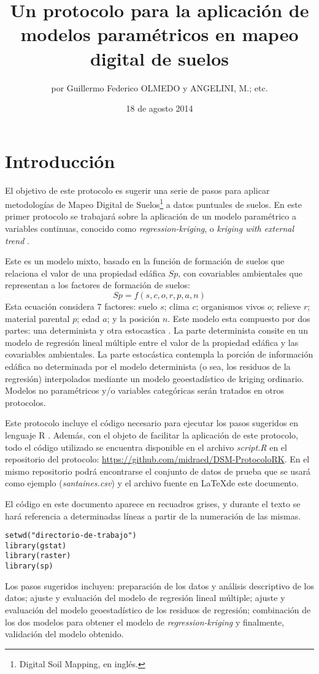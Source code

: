 \documentclass[10pt,a4paper]{article}
\date{18 de agosto 2014}
\title{Un protocolo para la aplicación de modelos paramétricos en mapeo digital de suelos}
\author{por Guillermo Federico OLMEDO y ANGELINI, M.; etc.}
\begin{document}
\maketitle
\section{Introducción}
El objetivo de este protocolo es sugerir una serie de pasos para aplicar metodologías de Mapeo Digital de Suelos\footnote{Digital Soil Mapping, en inglés.} a datos puntuales de suelos. En este primer protocolo se trabajará sobre la aplicación de un modelo paramétrico a variables continuas, conocido como \textit{regression-kriging}, o \textit{kriging with external trend} \citep{hengl_practical_2009}. 

Este es un modelo mixto, basado en la función de formación de suelos \citep{mcbratney_digital_2003} que relaciona el valor de una propiedad edáfica \(Sp\), con covariables ambientales que representan a los factores de formación de suelos: 
\begin{equation}
Sp = f(s,c,o,r,p,a,n)
\end{equation} 
Esta ecuación considera 7 factores: suelo \(s\); clima \(c\); organismos vivos \(o\); relieve \(r\); material parental \(p\); edad \(a\); y la posición \(n\). Este modelo esta compuesto por dos partes: una determinista y otra estocastica \citep{mcbratney_digital_2003}. La parte determinista consite en un modelo de regresión lineal múltiple entre el valor de la propiedad edáfica y las covariables ambientales. La parte estocástica contempla la porción de información edáfica no determinada por el modelo determinista (o sea, los residuos de la regresión) interpolados mediante un modelo geoestadístico de kriging ordinario.  Modelos no paramétricos y/o variables categóricas serán tratados en otros protocolos.

Este protocolo incluye el código necesario para ejecutar los pasos sugeridos en lenguaje R \citep{Rcit}. Además, con el objeto de facilitar la aplicación de este protocolo, todo el código utilizado se encuentra disponible en el archivo \textit{script.R} en el repositorio del protocolo: 
\url{https://github.com/midraed/DSM-ProtocoloRK}. En el mismo repositorio podrá encontrarse el conjunto de datos de prueba que se usará como ejemplo (\textit{santaines.csv}) y el archivo fuente en \LaTeX\space de este documento.

El código en este documento aparece en recuadros grises, y durante el texto se hará referencia a determinadas líneas a partir de la numeración de las mismas.
\begin{lstlisting}
setwd("directorio-de-trabajo")
library(gstat)
library(raster)
library(sp)
\end{lstlisting}
Los pasos sugeridos incluyen: preparación de los datos y  análisis descriptivo de los datos; ajuste y evaluación del modelo de regresión lineal múltiple; ajuste y evaluación del modelo geoestadístico de los residuos de regresión; combinación de los dos modelos para obtener el modelo de \textit{regression-kriging} y finalmente, validación del modelo obtenido.	
\end{document}
